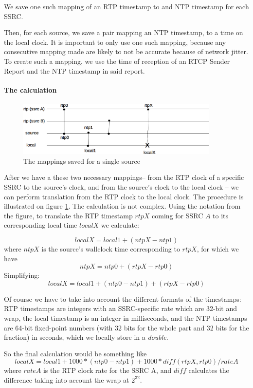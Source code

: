 \documentclass[twoside,openright,a4paper,12pt,english]{article}
\begin{document}
We save one such mapping of an RTP timestamp to and NTP timestamp for each SSRC.

Then, for each source, we save a pair mapping an NTP timestamp, to a time on
the local clock. It is important to only use one such mapping, because any
consecutive mapping made are likely to not be accurate because of network
jitter. To create such a mapping, we use the time of reception of an RTCP
Sender Report and the NTP timestamp in said report.

\paragraph{The calculation}
\begin{figure}[h]
    \includegraphics[width=0.9\textwidth]{./pics/diagram-sync.eps}
    \caption{The mappings saved for a single source}
    \label{diagram-sync}
\end{figure}
After we have a these two necessary mappings-- from the RTP clock of a specific
SSRC to the source's clock, and from the source's clock to the local clock -- we
can perform translation from the RTP clock to the local clock. The procedure is
illustrated on figure \ref{diagram-sync}. The calculation is not complex. Using the
notation from the figure, to translate the RTP timestamp $rtpX$ coming for
SSRC $A$ to its corresponding local time $localX$ we calculate:

$$localX = local1 + (ntpX - ntp1)$$ 
where $ntpX$ is the source's wallclock time corresponding to $rtpX$, for which we have
$$ntpX = ntp0 + (rtpX - rtp0)$$
Simplifying: $$localX = local1 + (ntp0 - ntp1) + (rtpX - rtp0)$$

Of course we have to take into account the different formats of the timestamps: RTP timestamps are integers with an SSRC-specific rate which are 32-bit and wrap, the local timestamp is an integer in milliseconds, and the
NTP timestamps are 64-bit fixed-point numbers (with 32 bits for the whole part
and 32 bits for the fraction) in seconds, which we locally store in a
\emph{double}.

So the final calculation would be something like
$$localX = local1 + 1000 * (ntp0 - ntp1) + 1000 * diff(rtpX, rtp0) / rateA$$
where $rateA$ is the RTP clock rate for the SSRC A, and $diff$ calculates the difference taking into account the wrap at $2^{32}$.
\end{document}
